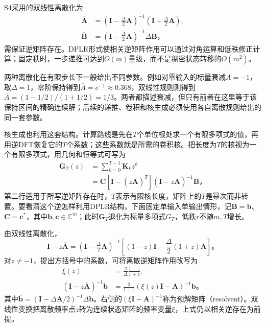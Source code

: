 S4采用的双线性离散化为
\begin{equation}
  \begin{aligned}
    \overline{\bm{A}}&=
      (\bm{I}-\tfrac{\Delta}{2}\bm{A})^{-1}
      (\bm{I}+\tfrac{\Delta}{2}\bm{A}),\\
    \overline{\bm{B}}&=
      (\bm{I}-\tfrac{\Delta}{2}\bm{A})^{-1}\Delta\bm{B}\text{，}
  \end{aligned}
  \label{eq:rnn-s4-bilinear}
\end{equation}
需保证逆矩阵存在。DPLR形式使相关逆矩阵作用可以通过对角运算和低秩修正计算；固定秩时，一步递推可达到$O(m)$量级，而不是稠密状态转移的$O(m^2)$。

两种离散化在有限步长下一般给出不同参数。例如对零输入的标量衰减$A=-1$，取$\Delta=1$，零阶保持得到$\overline A=e^{-1}\approx0.368$，双线性规则则得到$\overline A=(1-1/2)/(1+1/2)=1/3$。两者都描述衰减，但只有前者在这里等于该保持区间的精确连续解；后续的递推、卷积和核生成必须使用各自离散规则给出的同一套参数。

核生成也利用这套结构。计算路线是先在$T$个单位根处求一个有限多项式的值，再用逆DFT恢复它的$T$个系数；这些系数就是所需的卷积核。把长度为$T$的核视为一个有限多项式，用几何和恒等式可写为
\begin{equation}
  \begin{aligned}
    \bm{G}_T(z)&=\sum_{k=0}^{T-1}\bm{K}_k z^k\\
      &=\bm{C}\left[\bm{I}-(z\overline{\bm{A}})^T\right]
         (\bm{I}-z\overline{\bm{A}})^{-1}\overline{\bm{B}}\text{，}
  \end{aligned}
  \label{eq:rnn-s4-generating-function}
\end{equation}
第二行适用于所写逆矩阵存在时，$T$表示有限核长度，矩阵上的$T$是幂次而非转置。要看清这个逆怎样利用DPLR结构，下面固定单输入单输出情形，记$\bm B=\bm b$、$\bm C=\bm c^*$，其中$\bm b,\bm c\in\mathbb C^m$；此时$\bm G_T$退化为标量多项式$G_T$，低秩$r$不随$m,T$增长。

由双线性离散化，
\[
  \bm I-z\overline{\bm A}
    =(\bm I-\tfrac{\Delta}{2}\bm A)^{-1}
      \left[(1-z)\bm I-\frac{\Delta}{2}(1+z)\bm A\right]\text{。}
\]
对$z\neq-1$，提出方括号中的系数，可将离散逆矩阵作用改写为
\begin{equation}
  \begin{aligned}
    \xi(z)&=\frac{2}{\Delta}\frac{1-z}{1+z},\\
    (\bm I-z\overline{\bm A})^{-1}\overline{\bm b}
      &=\frac{2}{1+z}(\xi(z)\bm I-\bm A)^{-1}\bm b\text{。}
  \end{aligned}
  \label{eq:rnn-s4-resolvent}
\end{equation}
其中$\overline{\bm b}=(\bm I-\Delta\bm A/2)^{-1}\Delta\bm b$。右侧的$(\xi\bm I-\bm A)^{-1}$称为预解矩阵（resolvent）。双线性变换把离散频率点$z$转为连续状态矩阵的频率变量$\xi$，上式仍以相关逆存在为前提。

